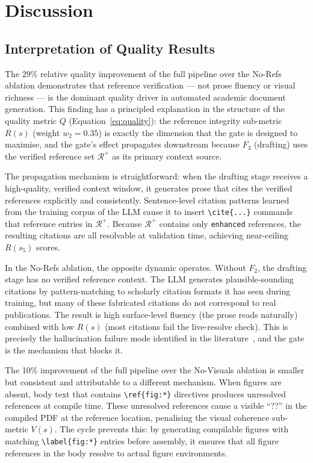 \section{Discussion}
\label{sec:discussion}

\subsection{Interpretation of Quality Results}

The 29\% relative quality improvement of the full pipeline over the No-Refs ablation
demonstrates that reference verification — not prose fluency or visual richness — is
the dominant quality driver in automated academic document generation.
This finding has a principled explanation in the structure of the quality metric $Q$
(Equation~\ref{eq:quality}): the reference integrity sub-metric $R(s)$ (weight $w_2=0.35$)
is exactly the dimension that the \cgrag{} gate is designed to maximise, and the
gate's effect propagates downstream because $F_3$ (drafting) uses the verified reference
set $\mathcal{R}^+$ as its primary context source.

The propagation mechanism is straightforward: when the drafting stage receives a
high-quality, verified context window, it generates prose that cites the verified
references explicitly and consistently.
Sentence-level citation patterns learned from the training corpus of the LLM cause
it to insert \texttt{\textbackslash cite\{...\}} commands that reference entries
in $\mathcal{R}^+$.
Because $\mathcal{R}^+$ contains only \texttt{enhanced} references, the resulting
citations are all resolvable at validation time, achieving near-ceiling $R(s_5)$ scores.

In the No-Refs ablation, the opposite dynamic operates.
Without $F_2$, the drafting stage has no verified reference context.
The LLM generates plausible-sounding citations by pattern-matching to scholarly
citation formats it has seen during training, but many of these fabricated citations
do not correspond to real publications.
The result is high surface-level fluency (the prose reads naturally) combined with
low $R(s)$ (most citations fail the live-resolve check).
This is precisely the hallucination failure mode identified in the literature~\cite{alkaissi2023hallucinated},
and the \cgrag{} gate is the mechanism that blocks it.

The 10\% improvement of the full pipeline over the No-Visuals ablation is smaller
but consistent and attributable to a different mechanism.
When figures are absent, body text that contains \texttt{\textbackslash ref\{fig:*\}}
directives produces unresolved references at compile time.
These unresolved references cause a visible ``??'' in the compiled PDF at the
reference location, penalising the visual coherence sub-metric $V(s)$.
The \tvg{} cycle prevents this: by generating compilable figures with matching
\texttt{\textbackslash label\{fig:*\}} entries before assembly, it ensures that
all figure references in the body resolve to actual figure environments.

